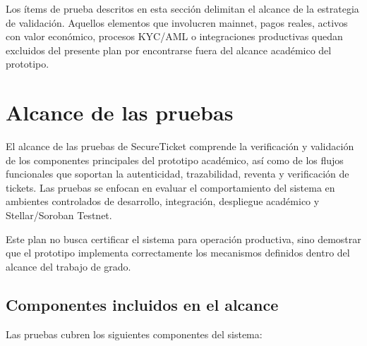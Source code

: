 \documentclass[12pt,letterpaper]{article}
\newcommand{\NombreProyecto}{SecureTicket}
\begin{document}
Los ítems de prueba descritos en esta sección delimitan el alcance de la estrategia de validación. Aquellos elementos que involucren mainnet, pagos reales, activos con valor económico, procesos KYC/AML o integraciones productivas quedan excluidos del presente plan por encontrarse fuera del alcance académico del prototipo.

\section{Alcance de las pruebas}

El alcance de las pruebas de \NombreProyecto{} comprende la verificación y validación de los componentes principales del prototipo académico, así como de los flujos funcionales que soportan la autenticidad, trazabilidad, reventa y verificación de tickets. Las pruebas se enfocan en evaluar el comportamiento del sistema en ambientes controlados de desarrollo, integración, despliegue académico y Stellar/Soroban Testnet.

Este plan no busca certificar el sistema para operación productiva, sino demostrar que el prototipo implementa correctamente los mecanismos definidos dentro del alcance del trabajo de grado.

\subsection{Componentes incluidos en el alcance}

Las pruebas cubren los siguientes componentes del sistema:
\end{document}
